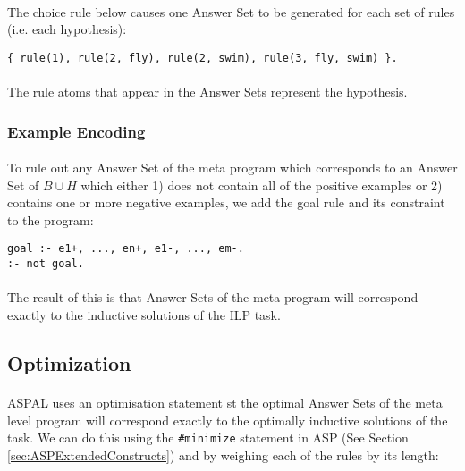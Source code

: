 \documentclass{article}
\theoremstyle{plain}
\theoremstyle{definition}
\begin{document}
\begin{multicols}{2}
\paragraph{} The choice rule below causes one Answer Set to be generated for each set of rules (i.e. each hypothesis):

\begin{lstlisting}
{ rule(1), rule(2, fly), rule(2, swim), rule(3, fly, swim) }.
\end{lstlisting}

\paragraph{} The rule atoms that appear in the Answer Sets represent the hypothesis. 

\subsubsection{Example Encoding}

\paragraph{} To rule out any Answer Set of the meta program which corresponds to an Answer Set of $B \cup H$ which either 1) does not contain all of the positive examples or 2) contains one or more negative examples, we add the goal rule and its constraint to the program:

\begin{lstlisting}
goal :- e1+, ..., en+, e1-, ..., em-.
:- not goal.
\end{lstlisting}

\paragraph{} The result of this is that Answer Sets of the meta program will correspond exactly to the inductive solutions of the ILP task. 

\subsection{Optimization}

\paragraph{} ASPAL uses an optimisation statement st the optimal Answer Sets of the meta level program will correspond exactly to the optimally inductive solutions of the task. We can do this using the \lstinline{#minimize} statement in ASP (See Section \ref{sec:ASPExtendedConstructs}) and by weighing each of the rules by its length:


\end{multicols}
\end{document}
